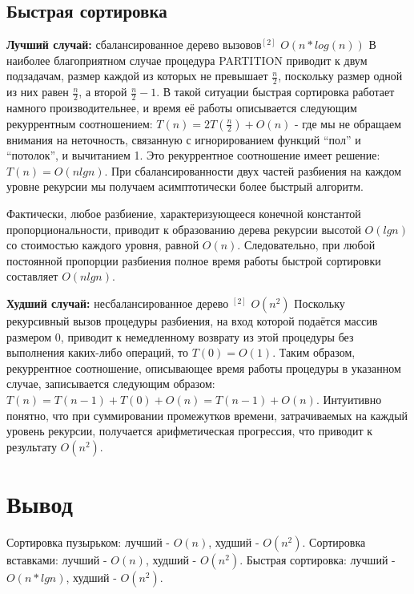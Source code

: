 \documentclass[12pt]{report}
\begin{document}
\subsection{Быстрая сортировка}
\hspace*{5mm}
\textbf{Лучший случай:} сбалансированное дерево вызовов$^{[2]}$ \(O(n*log(n))\)  
В наиболее благоприятном случае процедура PARTITION приводит к двум подзадачам, размер каждой из которых не превышает $\frac{n}{2}$, поскольку размер одной из них равен $\frac{n}{2}$, а второй $\frac{n}{2} - 1$. В такой ситуации быстрая сортировка работает намного производительнее, и время её работы описывается следующим рекуррентным соотношением: $T(n) = 2T(\frac{n}{2}) + O(n)$ - где мы не обращаем внимания на неточность, связанную с игнорированием функций “пол” и “потолок”, и вычитанием 1. Это рекуррентное соотношение имеет решение: $T(n) =O(nlgn)$. При сбалансированности двух частей разбиения на каждом уровне рекурсии мы получаем асимптотически более быстрый алгоритм.

Фактически, любое разбиение, характеризующееся конечной константой пропорциональности, приводит к образованию дерева рекурсии высотой $O(lgn)$ со стоимостью каждого уровня, равной $O(n)$. Следовательно, при любой постоянной пропорции разбиения полное время работы быстрой сортировки составляет $O(nlgn)$.

\textbf{Худший случай:} несбалансированное дерево $^{[2]}$ $O(n^2)$
Поскольку рекурсивный вызов процедуры разбиения, на вход которой подаётся массив размером 0, приводит к немедленному возврату из этой процедуры без выполнения каких-либо операций, то $T(0) = O(1)$. Таким образом, рекуррентное соотношение, описывающее время работы процедуры в указанном случае, записывается следующим образом: $T(n) = T(n - 1) + T(0) + O(n) = T(n - 1) + O(n)$. Интуитивно понятно, что при суммировании промежутков времени, затрачиваемых на каждый уровень рекурсии, получается арифметическая прогрессия, что приводит к результату $O(n^2)$.

\section{Вывод}
Сортировка пузырьком: лучший - $O(n)$, худший - $O(n^2)$. \newline
Сортировка вставками: лучший - $O(n)$, худший - $O(n^2)$. \newline
Быстрая сортировка: лучший - $O(n * lgn)$, худший - $O(n^2)$. \newline
\end{document}
